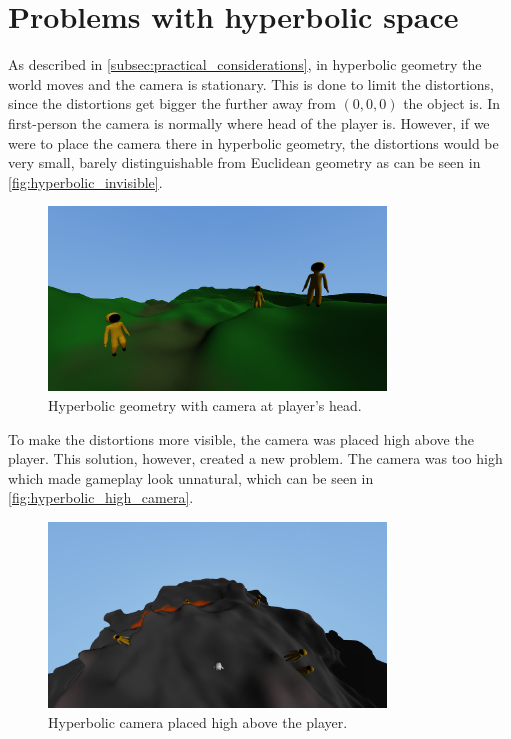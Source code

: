 \section{Problems with hyperbolic space} \label{sec:hyperbolic_problems}
As described in \autoref{subsec:practical_considerations}, in hyperbolic geometry the world moves and the camera is stationary.
This is done to limit the distortions, since the distortions get bigger the further away from $(0,0,0)$ the object is.
In first-person the camera is normally where head of the player is.
However, if we were to place the camera there in hyperbolic geometry, the distortions would be very small, barely distinguishable from Euclidean geometry as can be seen in \autoref{fig:hyperbolic_invisible}.

\begin{figure}[h]
    \centering
    \includegraphics[width=0.8\textwidth]{chapters/problems/resources/hyperbolic-invisible.png}
    \caption{Hyperbolic geometry with camera at player's head.}
    \label{fig:hyperbolic_invisible}
\end{figure}

To make the distortions more visible, the camera was placed high above the player.
This solution, however, created a new problem.
The camera was too high which made gameplay look unnatural, which can be seen in \autoref{fig:hyperbolic_high_camera}.

\begin{figure}[h]
    \centering
    \includegraphics[width=0.8\textwidth]{chapters/problems/resources/hyperbolic-high-camera.png}
    \caption{Hyperbolic camera placed high above the player.}
    \label{fig:hyperbolic_high_camera}
\end{figure}


